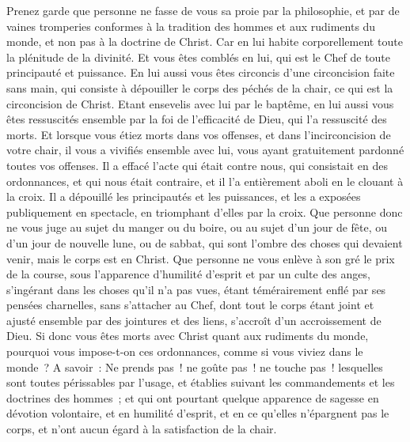 \begin{multicols}{2}
Prenez garde que personne ne fasse de vous sa proie par la philosophie, et par de vaines tromperies conformes à la tradition des hommes et aux rudiments du monde, et non pas à la doctrine de Christ.
Car en lui habite corporellement toute la plénitude de la divinité.
Et vous êtes comblés en lui, qui est le Chef de toute principauté et puissance.
En lui aussi vous êtes circoncis d'une circoncision faite sans main, qui consiste à dépouiller le corps des péchés de la chair, ce qui est la circoncision de Christ.
Etant ensevelis avec lui par le baptême, en lui aussi vous êtes ressuscités ensemble par la foi de l'efficacité de Dieu, qui l'a ressuscité des morts.
Et lorsque vous étiez morts dans vos offenses, et dans l'incirconcision de votre chair, il vous a vivifiés ensemble avec lui, vous ayant gratuitement pardonné toutes vos offenses.
Il a effacé l'acte qui était contre nous, qui consistait en des ordonnances, et qui nous était contraire, et il l'a entièrement aboli en le clouant à la croix.
Il a dépouillé les principautés et les puissances, et les a exposées publiquement en spectacle, en triomphant d'elles par la croix.
Que personne donc ne vous juge au sujet du manger ou du boire, ou au sujet d'un jour de fête, ou d'un jour de nouvelle lune, ou de sabbat,
qui sont l'ombre des choses qui devaient venir, mais le corps est en Christ.
Que personne ne vous enlève à son gré le prix de la course, sous l'apparence d'humilité d'esprit et par un culte des anges, s'ingérant dans les choses qu'il n'a pas vues, étant témérairement enflé par ses pensées charnelles,
sans s'attacher au Chef, dont tout le corps étant joint et ajusté ensemble par des jointures et des liens, s'accroît d'un accroissement de Dieu.
Si donc vous êtes morts avec Christ quant aux rudiments du monde, pourquoi vous impose-t-on ces ordonnances, comme si vous viviez dans le monde~?
A savoir~: Ne prends pas~! ne goûte pas~! ne touche pas~!
lesquelles sont toutes périssables par l'usage, et établies suivant les commandements et les doctrines des hommes~;
et qui ont pourtant quelque apparence de sagesse en dévotion volontaire, et en humilité d'esprit, et en ce qu'elles n'épargnent pas le corps, et n'ont aucun égard à la satisfaction de la chair.

\end{multicols}
